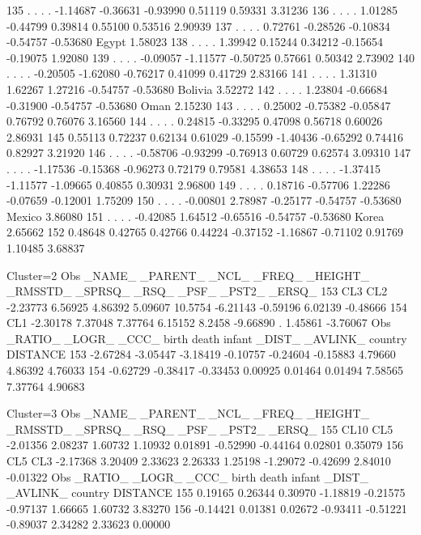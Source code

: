 \documentclass{article}
\begin{document}
\begin{Woutput}
135  .       .       .       .      -1.14687 -0.36631 -0.93990  0.51119  0.59331           3.31236
136  .       .       .       .       1.01285 -0.44799  0.39814  0.55100  0.53516           2.90939
137  .       .       .       .       0.72761 -0.28526 -0.10834 -0.54757 -0.53680 Egypt     1.58023
138  .       .       .       .       1.39942  0.15244  0.34212 -0.15654 -0.19075           1.92080
139  .       .       .       .      -0.09057 -1.11577 -0.50725  0.57661  0.50342           2.73902
140  .       .       .       .      -0.20505 -1.62080 -0.76217  0.41099  0.41729           2.83166
141  .       .       .       .       1.31310  1.62267  1.27216 -0.54757 -0.53680 Bolivia   3.52272
142  .       .       .       .       1.23804 -0.66684 -0.31900 -0.54757 -0.53680 Oman      2.15230
143  .       .       .       .       0.25002 -0.75382 -0.05847  0.76792  0.76076           3.16560
144  .       .       .       .       0.24815 -0.33295  0.47098  0.56718  0.60026           2.86931
145 0.55113 0.72237 0.62134 0.61029 -0.15599 -1.40436 -0.65292  0.74416  0.82927           3.21920
146  .       .       .       .      -0.58706 -0.93299 -0.76913  0.60729  0.62574           3.09310
147  .       .       .       .      -1.17536 -0.15368 -0.96273  0.72179  0.79581           4.38653
148  .       .       .       .      -1.37415 -1.11577 -1.09665  0.40855  0.30931           2.96800
149  .       .       .       .       0.18716 -0.57706  1.22286 -0.07659 -0.12001           1.75209
150  .       .       .       .      -0.00801  2.78987 -0.25177 -0.54757 -0.53680 Mexico    3.86080
151  .       .       .       .      -0.42085  1.64512 -0.65516 -0.54757 -0.53680 Korea     2.65662
152 0.48648 0.42765 0.42766 0.44224 -0.37152 -1.16867 -0.71102  0.91769  1.10485           3.68837

Cluster=2
Obs _NAME_ _PARENT_   _NCL_   _FREQ_ _HEIGHT_ _RMSSTD_ _SPRSQ_   _RSQ_    _PSF_   _PST2_  _ERSQ_
153  CL3     CL2    -2.23773 6.56925  4.86392  5.09607 10.5754 -6.21143 -0.59196 6.02139 -0.48666
154  CL1            -2.30178 7.37048  7.37764  6.15152  8.2458 -9.66890   .      1.45861 -3.76067
Obs  _RATIO_  _LOGR_    _CCC_    birth    death   infant   _DIST_ _AVLINK_ country DISTANCE
153 -2.67284 -3.05447 -3.18419 -0.10757 -0.24604 -0.15883 4.79660  4.86392          4.76033
154 -0.62729 -0.38417 -0.33453  0.00925  0.01464  0.01494 7.58565  7.37764          4.90683

Cluster=3
Obs _NAME_ _PARENT_   _NCL_   _FREQ_ _HEIGHT_ _RMSSTD_ _SPRSQ_   _RSQ_    _PSF_   _PST2_  _ERSQ_
155  CL10    CL5    -2.01356 2.08237  1.60732  1.10932 0.01891 -0.52990 -0.44164 0.02801  0.35079
156  CL5     CL3    -2.17368 3.20409  2.33623  2.26333 1.25198 -1.29072 -0.42699 2.84010 -0.01322
Obs  _RATIO_   _LOGR_   _CCC_     birth     death    infant    _DIST_  _AVLINK_  country  DISTANCE
155  0.19165  0.26344  0.30970  -1.18819  -0.21575  -0.97137  1.66665   1.60732            3.83270
156 -0.14421  0.01381  0.02672  -0.93411  -0.51221  -0.89037  2.34282   2.33623            0.00000


\end{Woutput}
\end{document}
